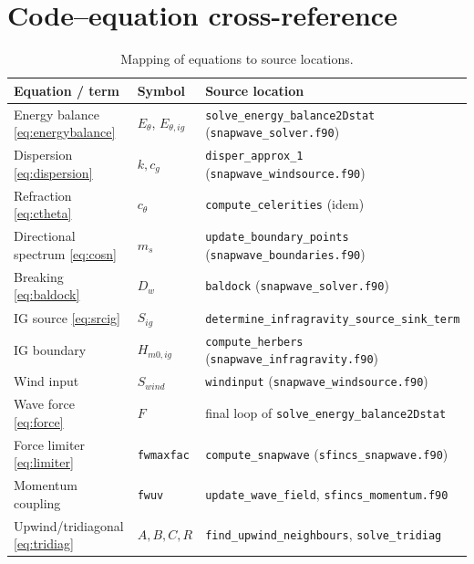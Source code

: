 \documentclass[11pt,a4paper]{article}
\newcommand{\ee}{E_\theta}
\newcommand{\code}[1]{\texttt{#1}}
\begin{document}
\section{Code--equation cross-reference}

\begin{table}[h!]
\centering
\small
\caption{Mapping of equations to source locations.}
\label{tab:map}
\begin{tabular}{@{}lll@{}}
\toprule
Equation / term & Symbol & Source location \\
\midrule
Energy balance \eqref{eq:energybalance} & $\ee$, $E_{\theta,ig}$ & \code{solve\_energy\_balance2Dstat} (\code{snapwave\_solver.f90}) \\
Dispersion \eqref{eq:dispersion} & $k,c_g$ & \code{disper\_approx\_1} (\code{snapwave\_windsource.f90}) \\
Refraction \eqref{eq:ctheta} & $c_\theta$ & \code{compute\_celerities} (idem) \\
Directional spectrum \eqref{eq:cosn} & $m_s$ & \code{update\_boundary\_points} (\code{snapwave\_boundaries.f90}) \\
Breaking \eqref{eq:baldock} & $D_w$ & \code{baldock} (\code{snapwave\_solver.f90}) \\
IG source \eqref{eq:srcig} & $S_{ig}$ & \code{determine\_infragravity\_source\_sink\_term} \\
IG boundary & $H_{m0,ig}$ & \code{compute\_herbers} (\code{snapwave\_infragravity.f90}) \\
Wind input & $S_{wind}$ & \code{windinput} (\code{snapwave\_windsource.f90}) \\
Wave force \eqref{eq:force} & $F$ & final loop of \code{solve\_energy\_balance2Dstat} \\
Force limiter \eqref{eq:limiter} & \code{fwmaxfac} & \code{compute\_snapwave} (\code{sfincs\_snapwave.f90}) \\
Momentum coupling & \code{fwuv} & \code{update\_wave\_field}, \code{sfincs\_momentum.f90} \\
Upwind/tridiagonal \eqref{eq:tridiag} & $A,B,C,R$ & \code{find\_upwind\_neighbours}, \code{solve\_tridiag} \\
\bottomrule
\end{tabular}
\end{table}
\end{document}
